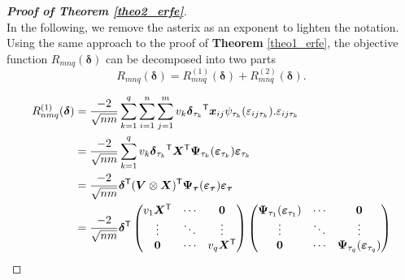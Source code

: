 \documentclass[15pt,a4paper]{article}
\newcommand{\transpose}{{}^{\text{\sffamily T}}}
\begin{document}
\begin{proof}[\textbf{Proof of Theorem \ref{theo2_erfe}}]$ $
~~\\
In the following, we remove the asterix as an exponent to lighten the notation. Using the same approach to the proof of \textbf{Theorem} \ref{theo1_erfe}, the objective function $R_{mnq}(\boldsymbol{\delta})$ can be decomposed into two parts
\begin{equation*}
    R_{mnq}(\boldsymbol{\delta})=R_{mnq}^{(1)}(\boldsymbol{\delta})+R_{mnq}^{(2)}
    (\boldsymbol{\delta}).
\end{equation*}

\begin{align*}
\begin{split}
R_{nmq}^{(1)}(\boldsymbol{\delta})&= \frac{-2}{\sqrt{nm}}\sum_{k=1}^{q}\sum_{i=1}^{n}\sum_{j=1}^{m} v_k
        \boldsymbol{\delta}_{\tau_k}\transpose\boldsymbol{x}_{ij}\psi_{\tau_k}(\varepsilon_{ij\tau_k}).\varepsilon_{ij\tau_k}\\ 
    &=\frac{-2}{\sqrt{nm}}\sum_{k=1}^{q}v_k\boldsymbol{\delta}_{\tau_k}\transpose\boldsymbol{X}\transpose\boldsymbol{\Psi}_{\tau_k}(\boldsymbol{\varepsilon}_{\tau_k})\boldsymbol{\varepsilon}_{\tau_k}\\
    &=\frac{-2}{\sqrt{nm}}\boldsymbol{\delta}\transpose (\boldsymbol{V}\otimes\boldsymbol{X})\transpose
   \boldsymbol{\Psi}_{\boldsymbol{\tau}}(\boldsymbol{\varepsilon}_{\boldsymbol{\tau}})\boldsymbol{\varepsilon}_{\boldsymbol{\tau}}\\
    &=\frac{-2}{\sqrt{nm}}\boldsymbol{\delta}\transpose
        \begin{pmatrix}
            v_1\boldsymbol{X}\transpose & \cdots & \boldsymbol{0} \\
            \vdots    & \ddots & \vdots  \\
            \boldsymbol{0} & \cdots & v_q\boldsymbol{X}\transpose
        \end{pmatrix}
       \begin{pmatrix}
            \boldsymbol{\Psi}_{\tau_1}(\boldsymbol{\varepsilon}_{\tau_1})  & \cdots & \boldsymbol{0} \\
            \vdots    & \ddots & \vdots  \\
            \boldsymbol{0} & \cdots & \boldsymbol{\Psi}_{\tau_q}(\boldsymbol{\varepsilon}_{\tau_q})
        \end{pmatrix}

\end{split}
\end{align*}
\end{proof}
\end{document}
